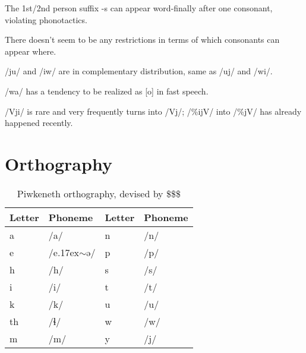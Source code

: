 \documentclass[smallroyalvopaper,9pt]{memoir}
\newcommand{\lang}{Piwkeneth}
\newcommand{\ttilde}{\raise.17ex\hbox{$\scriptstyle\sim$}}
\begin{document}


The 1st/2nd person suffix -s can appear word-finally after one consonant, violating phonotactics.

There doesn't seem to be any restrictions in terms of which consonants can appear where.

/ju/ and /iw/ are in complementary distribution, same as /uj/ and /wi/.

/wa/ has a tendency to be realized as [o] in fast speech.

/Vji/ is rare and very frequently turns into /Vj/; /\%ijV/ into /\%jV/ has already happened recently.

\newpage

\section{Orthography}

\begin{table}[ht]
    \centering
    \begin{tabular}{llll}
        \toprule
        Letter & Phoneme & Letter & Phoneme\\
        \midrule
        a & /a/ & n & /n/ \\
        e & /e\ttilde{}ə/ & p & /p/ \\
        h & /h/ & s & /s/ \\
        i & /i/ & t & /t/ \\
        k & /k/ & u & /u/ \\
        th& /ɬ/ & w & /w/ \\
        m & /m/ & y & /j/ \\
        \bottomrule
    \end{tabular}
    \caption{\lang{} orthography, devised by \$\$\$}
\end{table}
\end{document}
